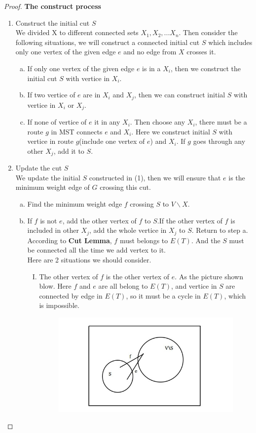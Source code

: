 \documentclass[12pt, notitlepage]{article}
\begin{document}
\begin{enumerate}
\begin{proof}
	\textbf{The construct process}
	\begin{enumerate}[(1)]
		\item Construct the initial cut $S$\\
		We divided X to different connected sets $X_1,X_2,...X_n$. Then consider the following situations, we will construct a connected initial cut $S$ which includes only one vertex of the given edge $e$ and no edge from $X$ crosses it.
		\begin{enumerate}[a.]
			\item If only one vertex of the given edge $e$ is in a $X_i$, then we construct the initial cut $S$ with vertice in $X_i$.
			\item If two vertice of $e$ are in $X_i$ and $X_j$, then we can construct initial $S$ with vertice in $X_i$ or $X_j$.
			\item If none of vertice of $e$ it in any $X_i$. Then choose any $X_i$, there must be a route $g$ in MST connects $e$ and $X_i$. Here we construct initial $S$ with vertice in route $g$(include one vertex of $e$) and $X_i$. If $g$ goes through any other $X_j$, add it to $S$.
		\end{enumerate}
		\item Update the cut $S$\\
		We update the initial $S$ constructed in (1), then we will ensure that $e$ is the minimum weight edge of $G$ crossing this cut.
		\begin{enumerate}[a.]
			\item Find the minimum weight edge $f$ crossing $S$ to $V\backslash X$.
			\item If $f$ is not $e$, add the other vertex of $f$ to $S$.If the other vertex of $f$ is included in other $X_j$, add the whole vertice in $X_j$ to $S$. Return to step a.\\
			According to \textbf{Cut Lemma}, $f$ must belongs to $E(T)$. And the $S$ must be connected all the time we add vertex to it. \\
			Here are 2 situations we should consider.
			\begin{enumerate}[I.]
				\item The other vertex of $f$ is the other vertex of $e$. As the picture shown blow. Here $f$ and $e$ are all belong to $E(T)$, and vertice in $S$ are connected by edge in $E(T)$, so it must be a cycle in $E(T)$, which is impossible.
				\begin{figure}[H]
					\center
					\includegraphics[width=0.6\linewidth]{p1.jpg}\vspace{-5pt}\nonumber

\end{figure}
\end{enumerate}
\end{enumerate}
\end{enumerate}
\end{proof}
\end{enumerate}
\end{document}
